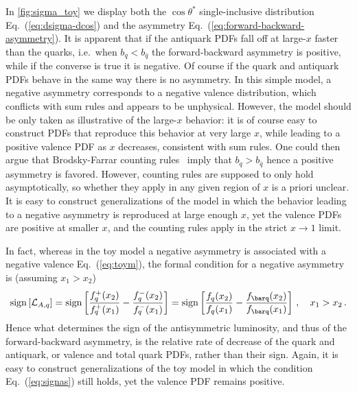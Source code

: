 In \cref{fig:sigma_toy} we display both the $\cos\theta^*$
single-inclusive distribution Eq.~(\ref{eq:dsigma-dcos}) and
the asymmetry Eq.~(\ref{eq:forward-backward-asymmetry}).
%
It is apparent that if the  antiquark PDFs fall off at large-$x$ faster than
the quarks, i.e.\ when $b_q < b_{\bar{q}}$ the forward-backward
asymmetry is positive, while if the converse is true it is
negative. Of course if the quark and antiquark PDFs behave in the same
way there is no asymmetry.
%
In this simple model, a negative asymmetry corresponds to a negative
valence distribution, which conflicts with sum rules and appears to be
unphysical. However, the model should be only taken as illustrative of
the large-$x$ behavior: it is of course easy to construct PDFs that
reproduce this behavior at very large $x$, while leading to a positive
valence PDF as $x$ decreases, consistent with sum rules. One could then argue that
Brodsky-Farrar counting rules~\cite{Brodsky:1973kr,Brodsky:1974vy}
imply that  $b_q > b_{\bar{q}}$
hence a positive asymmetry is favored.
%
However,
counting rules are supposed to only hold asymptotically, so whether
they apply in any given region of $x$ is a priori unclear.
%
It is easy
to construct generalizations of the model in which the behavior
leading to a negative asymmetry is reproduced at large enough $x$, yet
the valence PDFs are positive at smaller $x$, and the counting rules
apply in the strict $x\to1$ limit.

In fact, whereas in the toy model a negative asymmetry is
associated with a negative valence
Eq.~(\ref{eq:toym}), the formal condition for a negative asymmetry is
(assuming $x_1>x_2$)
\begin{equation}\label{eq:signas}
   \sign\left[\mathcal{L}_{A,q}\right]=\sign\left[\frac{ f_q^+(x_2)}{
       f_q^+(x_1)}-\frac{
       f_q^-(x_2)}{f_q^-(x_1)}\right]=\sign\left[\frac{ f_q(x_2)}{
       f_q(x_1)}-\frac{f_{\barq}(x_2)}{f_{\barq}(x_1)}\right] \, , \quad x_1>x_2 \,.
\end{equation}
Hence what determines the sign of the antisymmetric luminosity, and thus
of the forward-backward asymmetry, is the relative rate of decrease of
the quark and antiquark, or valence and total quark PDFs, rather than
their sign. Again, it is easy to construct generalizations of the
toy model in which the condition Eq.~(\ref{eq:signas}) still holds,  yet
the valence PDF remains positive.

